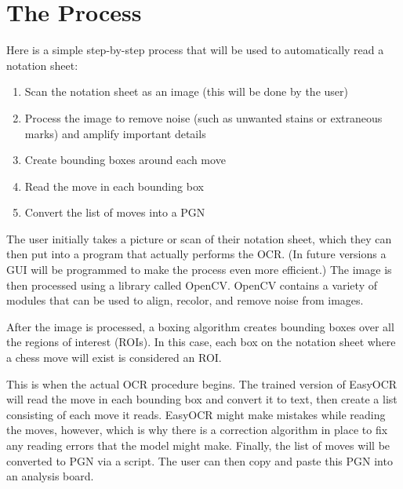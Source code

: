 \documentclass[12pt, two column, letterpaper]{article}
\begin{document}

\newpage



\section{The Process}

Here is a simple step-by-step process that will be used to automatically read a notation sheet:
\begin{enumerate}
    \item Scan the notation sheet as an image (this will be done by the user)
    \item Process the image to remove noise (such as unwanted stains or extraneous marks) and amplify important details
    \item Create bounding boxes around each move
    \item Read the move in each bounding box
    \item Convert the list of moves into a PGN
\end{enumerate}

The user initially takes a picture or scan of their notation sheet, which they can then put into a program that actually
performs the OCR. (In future versions a GUI will be programmed to make the process even more efficient.) The image is
then processed using a library called OpenCV. OpenCV contains a variety of modules that can be used to align, recolor,
and remove noise from images.

After the image is processed, a boxing algorithm creates bounding boxes over all the regions of interest (ROIs).
In this case, each box on the notation sheet where a chess move will exist is considered an ROI.

This is when the actual OCR procedure begins. The trained version of EasyOCR will read the move in each bounding box
and convert it to text, then create a list consisting of each move it reads. EasyOCR might make mistakes while reading
the moves, however, which is why there is a correction algorithm in place to fix any reading errors that the model might
make. Finally, the list of moves will be converted to PGN via a script. The user can then copy and paste this PGN into
an analysis board.
\end{document}
